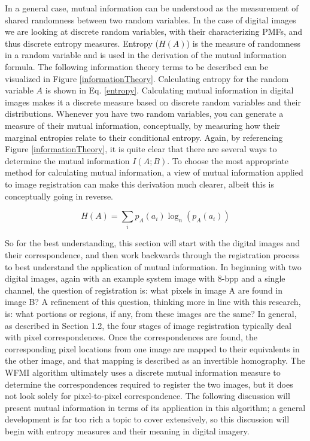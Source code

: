 In a general case, mutual information can be understood as the measurement of shared randomness between two random variables. In the case of digital images we are looking at discrete random variables, with their characterizing PMFs, and thus discrete entropy measures. Entropy ($H(A)$) is the measure of randomness in a random variable and is used in the derivation of the mutual information formula. The following information theory terms to be described can be visualized in Figure \ref{informationTheory}. Calculating entropy for the random variable $A$ is shown in Eq. \ref{entropy}. Calculating mutual information in digital images makes it a discrete measure based on discrete random variables and their distributions. Whenever you have two random variables, you can generate a measure of their mutual information, conceptually, by measuring how their marginal entropies relate to their conditional entropy. Again, by referencing Figure \ref{informationTheory}, it is quite clear that there are several ways to determine the mutual information $I(A;B)$. To choose the most appropriate method for calculating mutual information, a view of mutual information applied to image registration can make this derivation much clearer, albeit this is conceptually going in reverse.

\begin{equation}
\label{entropy}
	H(A) = \sum_{i}{p_{A}(a_{i}) \log_{n}{\left(p_{A}(a_{i})\right)}}
\end{equation}

So for the best understanding, this section will start with the digital images and their correspondence, and then work backwards through the registration process to best understand the application of mutual information. In beginning with two digital images, again with an example system image with 8-bpp and a single channel, the question of registration is: what pixels in image A are found in image B? A refinement of this question, thinking more in line with this research, is: what portions or regions, if any, from these images are the same? In general, as described in Section 1.2, the four stages of image registration typically deal with pixel correspondences. Once the correspondences are found, the corresponding pixel locations from one image are mapped to their equivalents in the other image, and that mapping is described as an invertible homography. The WFMI algorithm ultimately uses a discrete mutual information measure to determine the correspondences required to register the two images, but it does not look solely for pixel-to-pixel correspondence. The following discussion will present mutual information in terms of its application in this algorithm; a general development is far too rich a topic to cover extensively, so this discussion will begin with entropy measures and their meaning in digital imagery.


